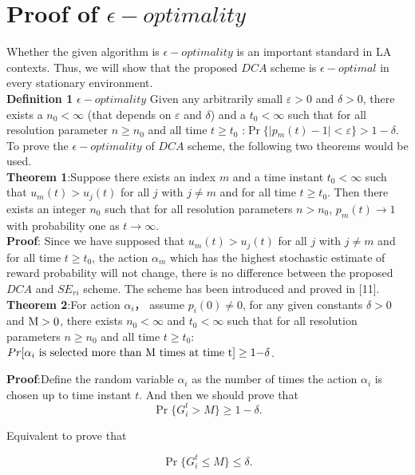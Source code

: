 \section{Proof of $\epsilon-optimality$}
\label{sec:3}
Whether the given algorithm is $\epsilon-optimality$ is an important standard in LA contexts. Thus, we will show that the proposed $DCA$ scheme is $\epsilon-optimal$ in every stationary environment.\\
\textbf{Definition 1} $\epsilon-optimality$ Given any arbitrarily small $\varepsilon > 0$ and $\delta > 0$, there exists a ${n_0} < \infty $ (that depends on $\varepsilon$ and $\delta $) and a ${t_0} < \infty $ such that for all resolution parameter $n \ge {n_0}$ and all time $t \ge {t_0}$ :$\Pr \{ |p{}_m(t) - 1| < \varepsilon \}  > 1 - \delta$.\\
To prove the $\epsilon-optimality$ of $DCA$ scheme, the following two theorems would be used.\\
\textbf{Theorem 1}:Suppose there exists an index $m$ and a time instant ${t_0} < \infty $ such that ${u_m}(t) > {u_j}(t)$ for all $j$ with $j \ne m$ and for all time $t \ge {t_0}$. Then there exists an integer $n_0$ such that for all resolution parameters $n > {n_0}$, ${p_m}(t) \to 1$ with probability one as $t \to \infty $.\\
\textbf{Proof}: Since we have supposed that ${u_m}(t) > {u_j}(t)$ for all $j$ with $j \ne m$ and for all time $t \ge t_0$, the action $\alpha_m$ which has the highest stochastic estimate of reward probability will not change, there is no difference between the proposed $DCA$ and $SE_{ri}$ scheme. The scheme has been introduced and proved in [11].\\
\textbf{Theorem 2}:For action $\alpha_i$， assume ${p_i}(0) \ne 0$, for any given constants $\delta  > 0$ and ${\rm M} > 0$, there exists ${n_0} < \infty $ and ${t_0} < \infty $ such that for all resolution parameters $n \ge {n_0}$ and all time $t \ge {t_0}$: $Pr [{\alpha _i}{\rm{\ is \  selected\ more\ than\ M\ times\ at\ time\ t]}} \ge {\rm{1 - }}\delta $.

\textbf{Proof}:Define the random variable ${\alpha _i}$ as the number of times the action ${\alpha _i}$ is chosen up to time instant $t$. And then we should prove that
\begin{equation}
\Pr \{ G_i^t > M\}  \ge 1 - \delta .
\end{equation}

Equivalent to prove that

\begin{equation}
\Pr \{ G_i^t \le M\}  \le \delta .
\end{equation}

